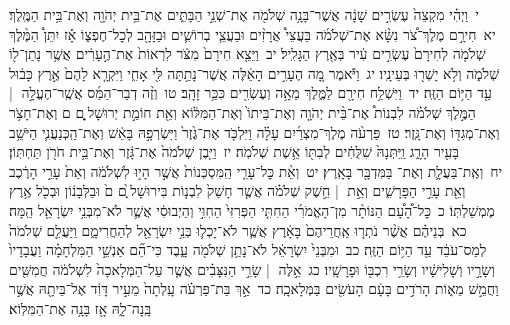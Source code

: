 \documentclass[18pt]{article}
\newcommand{\kri}[1]{\Afootnote{#1}}	%
\begin{document}
 {\loc י~}וַיְהִ֗י מִקְצֵה֙ עֶשְׂרִ֣ים שָׁנָ֔ה אֲשֶׁר־בָּנָ֥ה שְׁלֹמֹ֖ה אֶת־שְׁנֵ֣י הַבָּתִּ֑ים אֶת־בֵּ֥ית יְהֹוָ֖ה וְאֶת־בֵּ֥ית הַמֶּֽלֶךְ׃ \startlock
 {\loc יא~}חִירָ֣ם מֶלֶךְ־צֹ֠ר נִשָּׂ֨א אֶת־שְׁלֹמֹ֜ה בַּעֲצֵי֩ אֲרָזִ֨ים וּבַעֲצֵ֧י בְרוֹשִׁ֛ים וּבַזָּהָ֖ב לְכׇל־חֶפְצ֑וֹ אָ֡ז יִתֵּן֩ הַמֶּ֨לֶךְ שְׁלֹמֹ֤ה לְחִירָם֙ עֶשְׂרִ֣ים עִ֔יר בְּאֶ֖רֶץ הַגָּלִֽיל׃ \startlock
 {\loc יב~}וַיֵּצֵ֤א חִירָם֙ מִצֹּ֔ר לִרְאוֹת֙ אֶת־הֶ֣עָרִ֔ים אֲשֶׁ֥ר נָתַן־ל֖וֹ שְׁלֹמֹ֑ה וְלֹ֥א יָשְׁר֖וּ בְּעֵינָֽיו׃ \startlock
 {\loc יג~}וַיֹּ֕אמֶר מָ֚ה הֶעָרִ֣ים הָאֵ֔לֶּה אֲשֶׁר־נָתַ֥תָּה לִּ֖י אָחִ֑י וַיִּקְרָ֤א לָהֶם֙ אֶ֣רֶץ כָּב֔וּל עַ֖ד הַיּ֥וֹם הַזֶּֽה׃ \startlock
 {\loc יד~}וַיִּשְׁלַ֥ח חִירָ֖ם לַמֶּ֑לֶךְ מֵאָ֥ה וְעֶשְׂרִ֖ים כִּכַּ֥ר זָהָֽב׃ \startlock
 {\loc טו~}וְזֶ֨ה דְבַר־הַמַּ֜ס אֲשֶֽׁר־הֶעֱלָ֣ה  |  הַמֶּ֣לֶךְ שְׁלֹמֹ֗ה לִבְנוֹת֩ אֶת־בֵּ֨ית יְהֹוָ֤ה וְאֶת־בֵּיתוֹ֙ וְאֶת־הַמִּלּ֔וֹא וְאֵ֖ת חוֹמַ֣ת יְרוּשָׁל ָ֑͏ְם ם וְאֶת־חָצֹ֥ר וְאֶת־מְגִדּ֖וֹ וְאֶת־גָּֽזֶר׃ \startlock
 {\loc טז~}פַּרְעֹ֨ה מֶלֶךְ־מִצְרַ֜יִם עָלָ֗ה וַיִּלְכֹּ֤ד אֶת־גֶּ֙זֶר֙ וַיִּשְׂרְפָ֣הּ בָּאֵ֔שׁ וְאֶת־הַֽכְּנַעֲנִ֛י הַיֹּשֵׁ֥ב בָּעִ֖יר הָרָ֑ג וַֽיִּתְּנָהּ֙ שִׁלֻּחִ֔ים לְבִתּ֖וֹ אֵ֥שֶׁת שְׁלֹמֹֽה׃ \startlock
 {\loc יז~}וַיִּ֤בֶן שְׁלֹמֹה֙ אֶת־גָּ֔זֶר וְאֶת־בֵּ֥ית חֹרֹ֖ן תַּחְתּֽוֹן׃ \startlock
 {\loc יח~}וְאֶֽת־בַּעֲלָ֛ת וְאֶת־ \edtext{(תמר)}{\kri{קרי: תַּדְמֹ֥ר}}  בַּמִּדְבָּ֖ר בָּאָֽרֶץ׃ \startlock
 {\loc יט~}וְאֵ֨ת כׇּל־עָרֵ֤י הַֽמִּסְכְּנוֹת֙ אֲשֶׁ֣ר הָי֣וּ לִשְׁלֹמֹ֔ה וְאֵת֙ עָרֵ֣י הָרֶ֔כֶב וְאֵ֖ת עָרֵ֣י הַפָּרָשִׁ֑ים וְאֵ֣ת  |  חֵ֣שֶׁק שְׁלֹמֹ֗ה אֲשֶׁ֤ר חָשַׁק֙ לִבְנ֤וֹת בִּירוּשָׁל ַ֙͏ְם ם֙ וּבַלְּבָנ֔וֹן וּבְכֹ֖ל אֶ֥רֶץ מֶמְשַׁלְתּֽוֹ׃ \startlock
 {\loc כ~}כׇּל־הָ֠עָ֠ם הַנּוֹתָ֨ר מִן־הָאֱמֹרִ֜י הַחִתִּ֤י הַפְּרִזִּי֙ הַחִוִּ֣י וְהַיְבוּסִ֔י אֲשֶׁ֛ר לֹא־מִבְּנֵ֥י יִשְׂרָאֵ֖ל הֵֽמָּה׃ \startlock
 {\loc כא~}בְּנֵיהֶ֗ם אֲשֶׁ֨ר נֹתְר֤וּ אַֽחֲרֵיהֶם֙ בָּאָ֔רֶץ אֲשֶׁ֧ר לֹא־יָכְל֛וּ בְּנֵ֥י יִשְׂרָאֵ֖ל לְהַחֲרִימָ֑ם וַיַּעֲלֵ֤ם שְׁלֹמֹה֙ לְמַס־עֹבֵ֔ד עַ֖ד הַיּ֥וֹם הַזֶּֽה׃ \startlock
 {\loc כב~}וּמִבְּנֵי֙ יִשְׂרָאֵ֔ל לֹא־נָתַ֥ן שְׁלֹמֹ֖ה עָ֑בֶד כִּי־הֵ֞ם אַנְשֵׁ֣י הַמִּלְחָמָ֗ה וַעֲבָדָיו֙ וְשָׂרָ֣יו וְשָׁלִישָׁ֔יו וְשָׂרֵ֥י רִכְבּ֖וֹ וּפָרָשָֽׁיו׃ \startlock
 {\loc כג~}אֵ֣לֶּה  |  שָׂרֵ֣י הַנִּצָּבִ֗ים אֲשֶׁ֤ר עַל־הַמְּלָאכָה֙ לִשְׁלֹמֹ֔ה חֲמִשִּׁ֖ים וַחֲמֵ֣שׁ מֵא֑וֹת הָרֹדִ֣ים בָּעָ֔ם הָעֹשִׂ֖ים בַּמְּלָאכָֽה׃ \startlock
 {\loc כד~}אַ֣ךְ בַּת־פַּרְעֹ֗ה עָֽלְתָה֙ מֵעִ֣יר דָּוִ֔ד אֶל־בֵּיתָ֖הּ אֲשֶׁ֣ר בָּֽנָה־לָ֑הּ אָ֖ז בָּנָ֥ה אֶת־הַמִּלּֽוֹא׃ \startlock
\end{document}
